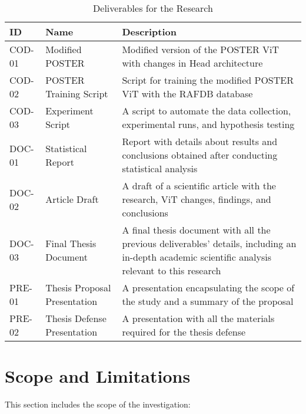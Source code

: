 \renewcommand{\arraystretch}{2.5}
\begin{table}[H]
\label{tb:table_deliverable}
\caption{Deliverables for the Research}
\begin{tabular}{@{}llp{10cm}@{}}
\toprule
\textbf{ID} & \textbf{Name} & \textbf{Description} \\ \midrule
COD-01 & Modified POSTER & 
\parbox[t]{10cm}{Modified version of the POSTER ViT with changes in Head architecture} \\
COD-02 & POSTER Training Script & 
\parbox[t]{10cm}{Script for training the modified POSTER ViT with the RAFDB database} \\
COD-03 & Experiment Script & 
\parbox[t]{10cm}{A script to automate the data collection, experimental runs, and hypothesis testing} \\
DOC-01 & Statistical Report & 
\parbox[t]{10cm}{Report with details about results and conclusions obtained after conducting statistical analysis} \\
DOC-02 & Article Draft & 
\parbox[t]{10cm}{A draft of a scientific article with the research, ViT changes, findings, and conclusions} \\
DOC-03 & Final Thesis Document & 
\parbox[t]{10cm}{A final thesis document with all the previous deliverables' details, including an in-depth academic scientific analysis relevant to this research} \\
PRE-01 & Thesis Proposal Presentation & 
\parbox[t]{10cm}{A presentation encapsulating the scope of the study and a summary of the proposal} \\
PRE-02 & Thesis Defense Presentation & 
\parbox[t]{10cm}{A presentation with all the materials required for the thesis defense} \\ 
\bottomrule
\end{tabular}
\end{table}

\section{Scope and Limitations}

This section includes the scope of the investigation:


